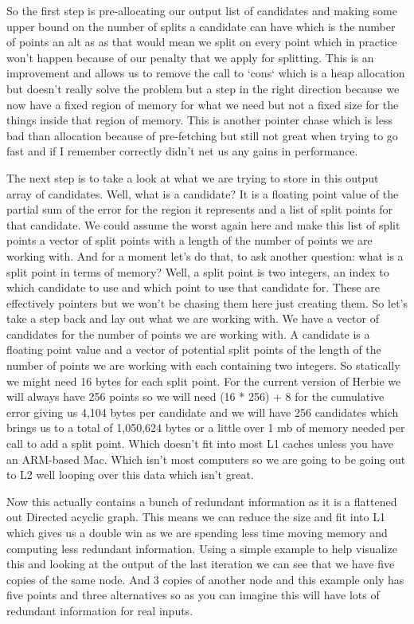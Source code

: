 \documentclass{article}
\begin{document}
So the first step is pre-allocating our output list of candidates and making some upper bound on the number of splits a candidate can have which is the number of points an alt as as that would mean we split on every point which in practice won’t happen because of our penalty that we apply for splitting. This is an improvement and allows us to remove the call to `cons` which is a heap allocation but doesn’t really solve the problem but a step in the right direction because we now have a fixed region of memory for what we need but not a fixed size for the things inside that region of memory. This is another pointer chase which is less bad than allocation because of pre-fetching but still not great when trying to go fast and if I remember correctly didn’t net us any gains in performance.

The next step is to take a look at what we are trying to store in this output array of candidates. Well, what is a candidate? It is a floating point value of the partial sum of the error for the region it represents and a list of split points for that candidate. We could assume the worst again here and make this list of split points a vector of split points with a length of the number of points we are working with. And for a moment let's do that, to ask another question: what is a split point in terms of memory? Well, a split point is two integers, an index to which candidate to use and which point to use that candidate for. These are effectively pointers but we won’t be chasing them here just creating them. So let's take a step back and lay out what we are working with. We have a vector of candidates for the number of points we are working with. A candidate is a floating point value and a vector of potential split points of the length of the number of points we are working with each containing two integers. So statically we might need 16 bytes for each split point. For the current version of Herbie we will always have 256 points so we will need (16 * 256) + 8 for the cumulative error giving us 4,104 bytes per candidate and we will have 256 candidates which brings us to a total of 1,050,624 bytes or a little over 1 mb of memory needed per call to add a split point. Which doesn’t fit into most L1 caches unless you have an ARM-based Mac. Which isn’t most computers so we are going to be going out to L2 well looping over this data which isn’t great.

Now this actually contains a bunch of redundant information as it is a flattened out Directed acyclic graph. This means we can reduce the size and fit into L1 which gives us a double win as we are spending less time moving memory and computing less redundant information. Using a simple example to help visualize this and looking at the output of the last iteration we can see that we have five copies of the same node. And 3 copies of another node and this example only has five points and three alternatives so as you can imagine this will have lots of redundant information for real inputs.
\end{document}

